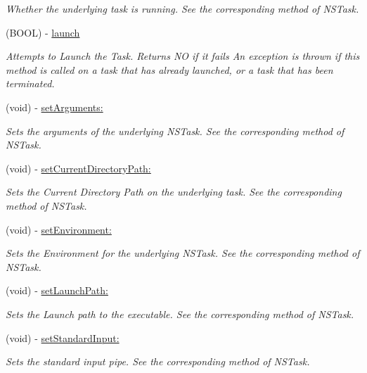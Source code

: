 \begin{CompactItemize}
\begin{CompactList}\small\item\em Whether the underlying task is running. See the corresponding method of NSTask. \item\end{CompactList}\item 
(BOOL) - \hyperlink{interface_m_f_task_3d205da2f4b5c916d55ca5aca2c7f80a}{launch}
\begin{CompactList}\small\item\em Attempts to Launch the Task. Returns NO if it fails An exception is thrown if this method is called on a task that has already launched, or a task that has been terminated. \item\end{CompactList}\item 
(void) - \hyperlink{interface_m_f_task_7f3a645cb573f47e28aab31fefea1eea}{setArguments:}
\begin{CompactList}\small\item\em Sets the arguments of the underlying NSTask. See the corresponding method of NSTask. \item\end{CompactList}\item 
(void) - \hyperlink{interface_m_f_task_44899b422530ddfd76073d9608df6672}{setCurrentDirectoryPath:}
\begin{CompactList}\small\item\em Sets the Current Directory Path on the underlying task. See the corresponding method of NSTask. \item\end{CompactList}\item 
(void) - \hyperlink{interface_m_f_task_72f01cdfaa5ba8761774154cf6ad1781}{setEnvironment:}
\begin{CompactList}\small\item\em Sets the Environment for the underlying NSTask. See the corresponding method of NSTask. \item\end{CompactList}\item 
(void) - \hyperlink{interface_m_f_task_770333b9990b65b2565314ee7ddf380e}{setLaunchPath:}
\begin{CompactList}\small\item\em Sets the Launch path to the executable. See the corresponding method of NSTask. \item\end{CompactList}\item 
(void) - \hyperlink{interface_m_f_task_dee902a3552d91fec48c1edda0486180}{setStandardInput:}
\begin{CompactList}\small\item\em Sets the standard input pipe. See the corresponding method of NSTask. \item\end{CompactList}\end{CompactItemize}
